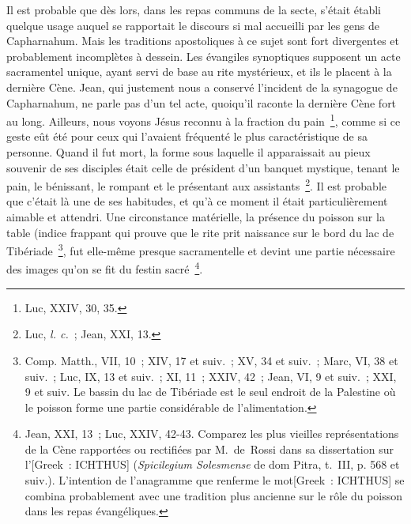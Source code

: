 \documentclass[french,twoside]{book} %
\begin{document}
Il est probable que dès lors, dans les repas communs de la secte, s’était établi quelque usage auquel se rapportait le discours si mal accueilli par les gens de Capharnahum. Mais les traditions apostoliques à ce sujet sont fort divergentes et probablement incomplètes à dessein. Les évangiles synoptiques supposent un acte sacramentel unique, ayant servi de base au rite mystérieux, et ils le placent à la dernière Cène. Jean, qui justement nous a conservé l’incident de la synagogue de Capharnahum, ne parle pas d’un tel acte, quoiqu’il raconte la dernière Cène fort au long. Ailleurs, nous voyons Jésus reconnu à la fraction du pain \footnote{ Luc, XXIV, 30, 35.}, comme si ce geste eût été pour ceux qui l’avaient fréquenté le plus caractéristique de sa personne. Quand il fut mort, la forme sous laquelle il apparaissait au pieux souvenir de ses disciples était celle de président d’un banquet mystique, tenant le pain, le bénissant, le rompant et le présentant aux assistants \footnote{ Luc, {\itshape l. c.} ; Jean, XXI, 13.}. Il est probable que c’était là une de ses habitudes, et qu’à ce moment il était particulièrement aimable et attendri. Une circonstance matérielle, la présence du poisson sur la table (indice frappant qui prouve que le rite prit naissance sur le bord du lac de Tibériade \footnote{Comp. Matth., VII, 10 ; XIV, 17 et suiv. ; XV, 34 et suiv. ; Marc, VI, 38 et suiv. ; Luc, IX, 13 et suiv. ; XI, 11 ; XXIV, 42 ; Jean, VI, 9 et suiv. ; XXI, 9 et suiv. Le bassin du lac de Tibériade est le seul endroit de la Palestine où le poisson forme une partie considérable de l’alimentation.}, fut elle-même presque sacramentelle et devint une partie nécessaire des images qu’on se fit du festin sacré \footnote{ Jean, XXI, 13 ; Luc, XXIV, 42-43. Comparez les plus vieilles représentations de la Cène rapportées ou rectifiées par M. de Rossi dans sa dissertation sur l’[Greek : ICHTHUS] ({\itshape Spicilegium Solesmense} de dom Pitra, t. III, p. 568 et suiv.). L’intention de l’anagramme que renferme le mot[Greek : ICHTHUS] se combina probablement avec une tradition plus ancienne sur le rôle du poisson dans les repas évangéliques.}.\par
\end{document}
